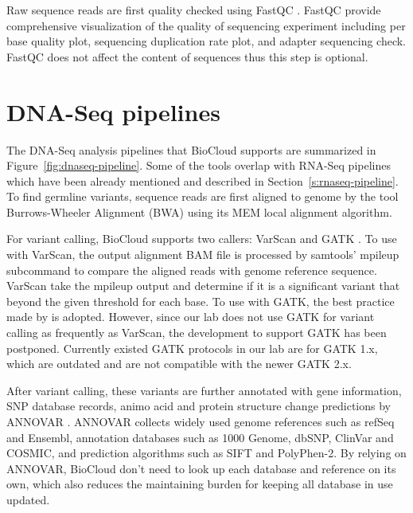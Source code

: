 Raw sequence reads are first quality checked using FastQC \cite{:fastqc}.
FastQC provide comprehensive visualization of the quality of sequencing
experiment including per base quality plot, sequencing duplication rate plot,
and adapter sequencing check. FastQC does not affect the content of sequences
thus this step is optional.



\section{DNA-Seq pipelines}

The DNA-Seq analysis pipelines that BioCloud supports are summarized in
Figure~\ref{fig:dnaseq-pipeline}. Some of the tools overlap with RNA-Seq
pipelines which have been already mentioned and described in
Section~\ref{s:rnaseq-pipeline}. To find germline variants, sequence reads are
first aligned to genome by the tool Burrows-Wheeler Alignment (BWA)
\cite{li2009:fast} using its MEM local alignment algorithm.



For variant calling, BioCloud supports two callers: VarScan
\cite{koboldt2012:varscan} and GATK
\cite{vanderauwera2013:fastq,mckenna2010:genome}. To use with VarScan, the
output alignment BAM file is processed by samtools' mpileup subcommand to
compare the aligned reads with genome reference sequence. VarScan take the
mpileup output and determine if it is a significant variant that beyond the
given threshold for each base. To use with GATK, the best practice
\cite{vanderauwera2013:fastq} made by \citeauthor{vanderauwera2013:fastq} is
adopted. However, since our lab does not use GATK for variant calling as
frequently as VarScan, the development to support GATK has been postponed.
Currently existed GATK protocols in our lab are for GATK 1.x, which are
outdated and are not compatible with the newer GATK 2.x.

After variant calling, these variants are further annotated with gene
information, SNP database records, animo acid and protein structure change
predictions by ANNOVAR \cite{wang2010:annovar}. ANNOVAR collects widely used
genome references such as refSeq and Ensembl, annotation databases such as 1000
Genome, dbSNP, ClinVar and COSMIC, and prediction algorithms such as SIFT and
PolyPhen-2. By relying on ANNOVAR, BioCloud don't need to look up each database
and reference on its own, which also reduces the maintaining burden for keeping
all database in use updated.



